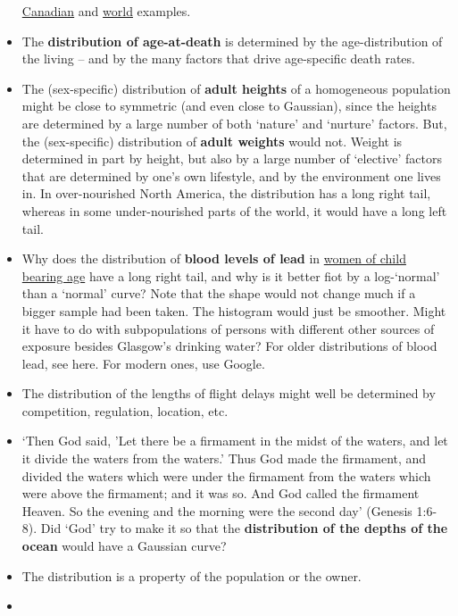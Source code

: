 \documentclass[]{book}
\begin{document}
\begin{itemize}
  \href{https://www12.statcan.gc.ca/census-recensement/2016/dp-pd/pyramid/pyramid.cfm?type=1\&geo1=01}{Canadian} and \href{https://www.visualcapitalist.com/animation-population-pyramids-10-biggest-countries/}{world} examples.
\item
  The \textbf{distribution of age-at-death} is determined by the age-distribution of the living -- and by the many factors that drive age-specific death rates.
\item
  The (sex-specific) distribution of \textbf{adult heights} of a homogeneous population might be close to symmetric (and even close to Gaussian), since the heights are determined by a large number of both `nature' and `nurture' factors. But, the (sex-specific) distribution of \textbf{adult weights} would not. Weight is determined in part by height, but also by a large number of `elective' factors that are determined by one's own lifestyle, and by the environment one lives in. In over-nourished North America, the distribution has a long right tail, whereas in some under-nourished parts of the world, it would have a long left tail.
\item
  Why does the distribution of \textbf{blood levels of lead} in
  \href{http://www.medicine.mcgill.ca/epidemiology/hanley/c607/ch01/homegrown_exercises_01.pdf\#page=2}{women of child bearing age} have a long right tail, and why is it better fiot by a log-`normal' than a `normal' curve? Note that the shape would not change much if a bigger sample had been taken. The histogram would just be smoother. Might it have to do with subpopulations of persons with different other sources of exposure besides Glasgow's drinking water? For older distributions of blood lead, see here. For modern ones, use Google.
\item
  The distribution of the lengths of flight delays might well be determined by competition, regulation, location, etc.
\item
  `Then God said, 'Let there be a firmament in the midst of the waters, and let it divide the waters from the waters.' Thus God made the firmament, and divided the waters which were under the firmament from the waters which were above the firmament; and it was so. And God called the firmament Heaven. So the evening and the morning were the second day' (Genesis 1:6-8). Did `God' try to make it so that the \textbf{distribution of the depths of the ocean} would have a Gaussian curve?
\item
  The distribution is a property of the population or the owner.
\item

\end{itemize}
\end{document}
